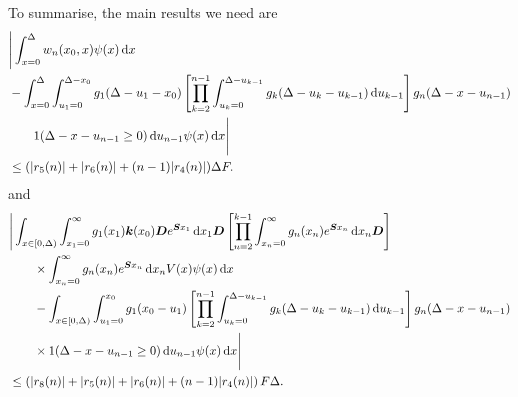To summarise, the main results we need are 
\begin{align}
	&\Bigg| \int_{x=0}^\Delta w_n(x_0,x) \psi(x) \wrt x \nonumber 
%
	\\&{}- \int_{x=0}^\Delta \int_{u_1=0}^{\Delta-x_0}g_1(\Delta - u_1 - x_0)
	\left[\prod_{k=2}^{n-1} \int_{u_k=0}^{\Delta-u_{k-1}} g_k(\Delta-u_k-u_{k-1})\wrt u_{k-1}\right] \nonumber 
			g_{n}(\Delta - x-u_{n-1})
\\&\qquad{} 1(\Delta-x-u_{n-1}\geq0) \wrt u_{n-1}\psi(x) \wrt x \Bigg| \nonumber
	\\&\leq (|r_5(n)| + |r_6(n)| + (n-1)|r_4(n)|)\Delta F. \label{eqn: rhs g 4dvfklsmv2}
\end{align}
and 
\begin{align}
	&\Bigg| \int_{x\in[0,\Delta)} \int_{x_1=0}^\infty g_1(x_1) \bs k(x_0) \bs D e^{\bs{S}x_1}\wrt x_1\bs D 
			\left[\prod_{n=2}^{k-1}\int_{x_n=0}^\infty g_n(x_n) e^{\bs{S}x_n} \wrt x_n
	\bs D\right] \nonumber 
			\\&\qquad{}\times\int_{x_n=0}^\infty g_{n}(x_n) e^{\bs{S}x_n} \wrt x_n V(x) \psi(x)\wrt x \nonumber 
%
	\\&\qquad {}- \int_{x\in[0,\Delta)} \int_{u_1=0}^{x_0}g_1(x_0 - u_1)
	\left[\prod_{k=2}^{n-1} \int_{u_k=0}^{\Delta-u_{k-1}} g_k(\Delta-u_k-u_{k-1})\wrt u_{k-1}\right] \nonumber 
			g_{n}(\Delta - x-u_{n-1})
\\&\qquad{} \times1(\Delta-x-u_{n-1}\geq0)\wrt u_{n-1}\psi(x)\wrt x \Bigg| \nonumber
	\\&\leq \left(|r_8(n)|+|r_5(n)|+|r_6(n)| + (n-1)|r_4(n)|\right)F\Delta.\label{eqn: KAFnnmna22}
\end{align}

